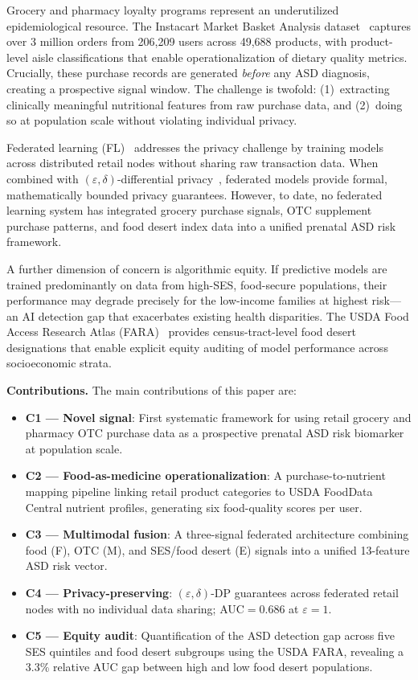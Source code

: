 \documentclass[journal]{IEEEtran}
\newcommand{\eps}{\varepsilon}
\begin{document}
Grocery and pharmacy loyalty programs represent an underutilized
epidemiological resource. The Instacart Market Basket Analysis
dataset~\cite{instacart2017} captures over 3 million orders from
206,209 users across 49,688 products, with product-level aisle
classifications that enable operationalization of dietary quality
metrics. Crucially, these purchase records are generated \textit{before}
any ASD diagnosis, creating a prospective signal window. The challenge
is twofold: (1)~extracting clinically meaningful nutritional features
from raw purchase data, and (2)~doing so at population scale without
violating individual privacy.

Federated learning (FL)~\cite{mcmahan2017communication} addresses the
privacy challenge by training models across distributed retail nodes
without sharing raw transaction data. When combined with
$(\eps,\delta)$-differential privacy~\cite{dwork2014algorithmic},
federated models provide formal, mathematically bounded privacy
guarantees. However, to date, no federated learning system has
integrated grocery purchase signals, OTC supplement purchase patterns,
and food desert index data into a unified prenatal ASD risk framework.

A further dimension of concern is algorithmic equity. If predictive
models are trained predominantly on data from high-SES, food-secure
populations, their performance may degrade precisely for the
low-income families at highest risk---an AI detection gap that
exacerbates existing health disparities. The USDA Food Access Research
Atlas (FARA)~\cite{usdafara2019} provides census-tract-level food
desert designations that enable explicit equity auditing of model
performance across socioeconomic strata.

\textbf{Contributions.} The main contributions of this paper are:
\begin{itemize}
  \item \textbf{C1 --- Novel signal}: First systematic framework for
        using retail grocery and pharmacy OTC purchase data as a
        prospective prenatal ASD risk biomarker at population scale.
  \item \textbf{C2 --- Food-as-medicine operationalization}: A
        purchase-to-nutrient mapping pipeline linking retail product
        categories to USDA FoodData Central nutrient profiles,
        generating six food-quality scores per user.
  \item \textbf{C3 --- Multimodal fusion}: A three-signal federated
        architecture combining food (F), OTC (M), and SES/food desert
        (E) signals into a unified 13-feature ASD risk vector.
  \item \textbf{C4 --- Privacy-preserving}: $(\eps,\delta)$-DP
        guarantees across federated retail nodes with no individual
        data sharing; AUC$=0.686$ at $\eps=1$.
  \item \textbf{C5 --- Equity audit}: Quantification of the ASD
        detection gap across five SES quintiles and food desert
        subgroups using the USDA FARA, revealing a 3.3\% relative
        AUC gap between high and low food desert populations.
\end{itemize}
\end{document}
